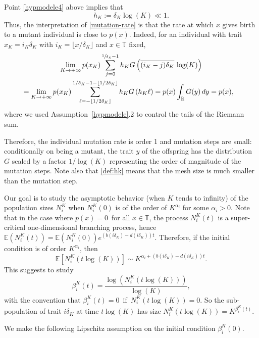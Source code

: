 \documentclass[10pt]{amsart}
\let\f\frac
\theoremstyle{plain}
\theoremstyle{remark}
\newcommand\T{\mathbb{T}}
\newcommand\E{\mathbb{E}}
\begin{document}
Point \eqref{hypmodele4} above implies that
\begin{equation}\label{def:hk}
h_K:=\delta_K \log(K)\ll 1.
\end{equation}
Thus, the interpretation of \eqref{mutation-rate} is that the rate at which $x$ gives birth to a mutant individual is close to $ p(x)$. Indeed, for an individual with trait $x_K=i_K \delta_K$ with $i_K=\lfloor x/\delta_K\rfloor$ and $x\in\T$ fixed,
\begin{multline*}%
\lim_{K\to +\infty}p(x_K)\sum_{j=0}^{\sfrac{1}{\delta_K}-1} h_K G\left(\overline{(i_K-j)\delta_K}\, \log(K)\right) \\
\begin{aligned} &= \lim_{K\to +\infty}p(x_K)\sum_{\ell=-\lfloor 1/2\delta_K\rfloor}^{1/\delta_K-1-\lfloor 1/2\delta_K\rfloor} h_K G\left(h_K\ell\right) =p(x)\int_{\mathbb{R}}G(y)\,dy=p(x),
\end{aligned}
\end{multline*}
where we used Assumption~\ref{hypmodele}.2 to control the tails of the Riemann sum.

Therefore, the individual mutation rate is order 1
and mutation steps are small: conditionally on being a mutant, the trait $y$ of the offspring has the distribution $G$ scaled by a factor $1/\log(K)$ representing the order of magnitude of the mutation steps.
Note also that \eqref{def:hk} means that the mesh size is much smaller than the mutation step.

Our goal is to study the asymptotic behavior (when $K$ tends to infinity) of the population sizes $N_i^K$ when $N_i^K(0)$ is of the order of $K^{\alpha_i}$ for some $\alpha_i>0$. Note that in the case where $p(x)=0\,$ for all $x\in\T$, the process $N^K_i(t)$ is a super-critical one-dimensional branching process, hence $\E(N^K_i(t))=\E(N^K_i(0)) e^{(b(i \delta_K)-d(i\delta_K))t}$. Therefore, if the initial condition is of order $K^{\alpha_i}$, then
\[
\E[ N^K_i(t\log(K))]\sim K^{\alpha_i + (b(i \delta_K)-d(i\delta_K))t}.
\]
This suggests to study
\begin{equation*}%
\label{beta}
\beta_i^K(t)=\f{\log(N_i^K(t \log(K)))}{\log(K)},
\end{equation*}
with the convention that $\beta^K_i(t)=0\,$ if $\,N^K_i(t\log(K))=0$. So the sub-population of trait $i\delta_K$ at time $t\log(K)$ has size $N^K_i(t \log(K))=K^{\beta^K_i(t)}$.

We make the following Lipschitz assumption on the initial condition $\beta^K_i(0)$.
\end{document}
